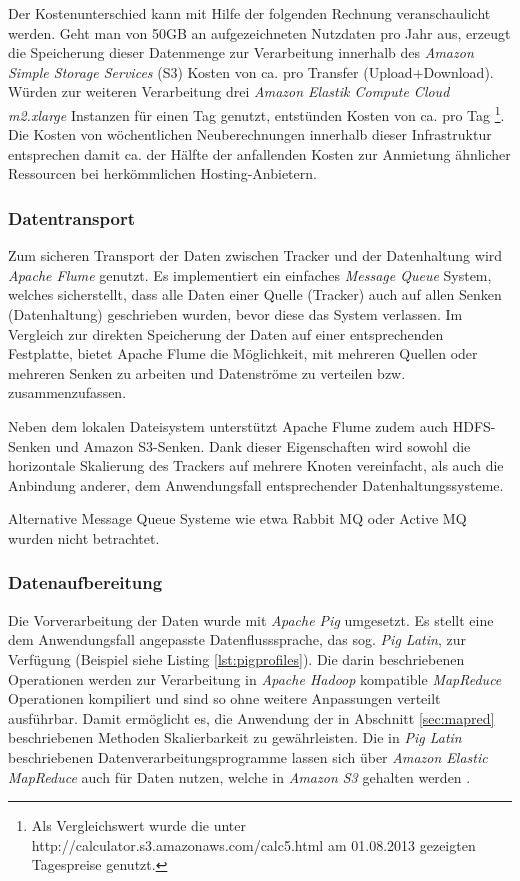 Der Kostenunterschied kann mit Hilfe der folgenden Rechnung veranschaulicht werden. Geht man von 50GB an aufgezeichneten Nutzdaten pro Jahr aus, erzeugt die Speicherung dieser Datenmenge zur Verarbeitung innerhalb des \textit{Amazon Simple Storage Services} (S3) Kosten von ca.  pro Transfer (Upload+Download). Würden zur weiteren Verarbeitung drei \textit{Amazon Elastik Compute Cloud} \textit{m2.xlarge} Instanzen für einen Tag genutzt, entstünden Kosten von ca.  pro Tag \footnote{Als Vergleichswert wurde die unter http://calculator.s3.amazonaws.com/calc5.html am 01.08.2013 gezeigten Tagespreise genutzt.}. Die Kosten von wöchentlichen Neuberechnungen innerhalb dieser Infrastruktur entsprechen damit ca. der Hälfte der anfallenden Kosten zur Anmietung ähnlicher Ressourcen bei herkömmlichen Hosting-Anbietern.

\subsubsection{Datentransport} \label{sec:datatransp} Zum sicheren Transport der Daten zwischen Tracker und der Datenhaltung wird \textit{Apache Flume} genutzt. Es implementiert ein einfaches \textit{Message Queue} System, welches sicherstellt, dass alle Daten einer Quelle (Tracker) auch auf allen Senken (Datenhaltung) geschrieben wurden, bevor diese das System verlassen. Im Vergleich zur direkten Speicherung der Daten auf einer entsprechenden Festplatte, bietet Apache Flume die Möglichkeit, mit mehreren Quellen oder mehreren Senken zu arbeiten und Datenströme zu verteilen bzw. zusammenzufassen.

Neben dem lokalen Dateisystem unterstützt Apache Flume zudem auch HDFS-Senken und Amazon S3-Senken. Dank dieser Eigenschaften wird sowohl die horizontale Skalierung des Trackers auf mehrere Knoten vereinfacht, als auch die Anbindung anderer, dem Anwendungsfall entsprechender Datenhaltungssysteme.

Alternative Message Queue Systeme wie etwa Rabbit MQ oder Active MQ wurden nicht betrachtet.

\subsubsection{Datenaufbereitung}\label{sec:dataprep_real} Die Vorverarbeitung der Daten wurde mit \textit{Apache Pig} umgesetzt. Es stellt eine dem Anwendungsfall angepasste Datenflusssprache, das sog. \textit{Pig Latin}, zur Verfügung (Beispiel siehe Listing \ref{lst:pigprofiles}). Die darin beschriebenen Operationen werden zur Verarbeitung in \textit{Apache Hadoop} kompatible \textit{MapReduce} Operationen kompiliert und sind so ohne weitere Anpassungen verteilt ausführbar.  Damit ermöglicht es, die Anwendung der in Abschnitt \ref{sec:mapred} beschriebenen Methoden Skalierbarkeit zu gewährleisten. Die in \textit{Pig Latin} beschriebenen Datenverarbeitungsprogramme lassen sich über \textit{Amazon Elastic MapReduce} auch für Daten nutzen, welche in \textit{Amazon S3} gehalten werden \citep{Lin2012}.

